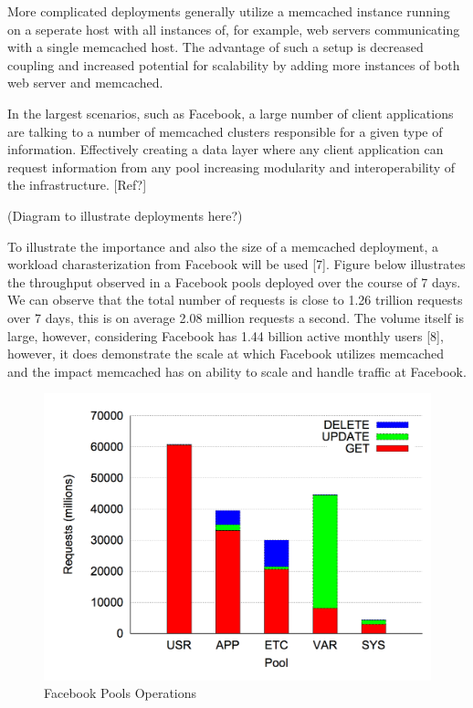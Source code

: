 More complicated deployments generally utilize a memcached instance
running on a seperate host with all instances of, for example, web
servers communicating with a single memcached host. The advantage of
such a setup is decreased coupling and increased potential for
scalability by adding more instances of both web server and memcached.

In the largest scenarios, such as Facebook, a large number of client
applications are talking to a number of memcached clusters responsible
for a given type of information. Effectively creating a data layer where
any client application can request information from any pool increasing
modularity and interoperability of the infrastructure. {[}Ref?{]}

(Diagram to illustrate deployments here?)

To illustrate the importance and also the size of a memcached
deployment, a workload charasterization from Facebook will be used
{[}7{]}. Figure below illustrates the throughput observed in a Facebook
pools deployed over the course of 7 days. We can observe that the total
number of requests is close to 1.26 trillion requests over 7 days, this
is on average 2.08 million requests a second. The volume itself is
large, however, considering Facebook has 1.44 billion active monthly
users {[}8{]}, however, it does demonstrate the scale at which Facebook
utilizes memcached and the impact memcached has on ability to scale and
handle traffic at Facebook.

\begin{figure}[htbp]
\centering
\includegraphics{./res/5_facebook_pool_ops.png}
\caption{Facebook Pools Operations}
\end{figure}

